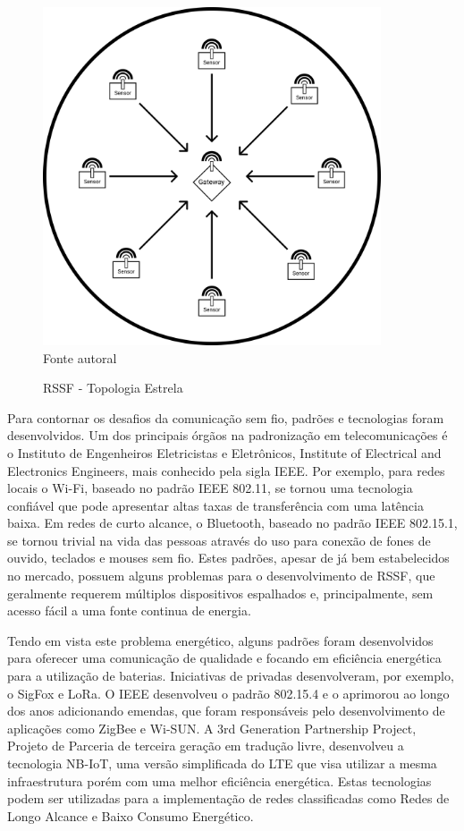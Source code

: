 \begin{figure}[ht]
    \begin{center}
        \caption{RSSF - Topologia Estrela}
        \includegraphics[width=10cm]{./sections/textual/chapters/images/intro_rssf.png}\\
        Fonte autoral
        \label{fig:rssf}
    \end{center}
\end{figure}

Para contornar os desafios da comunicação sem fio, padrões e tecnologias foram desenvolvidos. Um dos principais órgãos na padronização em telecomunicações é o Instituto de Engenheiros Eletricistas e Eletrônicos, Institute of Electrical and Electronics Engineers, mais conhecido pela sigla IEEE. Por exemplo, para redes locais o Wi-Fi, baseado no padrão IEEE 802.11, se tornou uma tecnologia confiável que pode apresentar altas taxas de transferência com uma latência baixa. Em redes de curto alcance, o Bluetooth, baseado no padrão IEEE 802.15.1, se tornou trivial na vida das pessoas através do uso para conexão de fones de ouvido, teclados e mouses sem fio. Estes padrões, apesar de já bem estabelecidos no mercado, possuem alguns problemas para o desenvolvimento de RSSF, que geralmente requerem múltiplos dispositivos espalhados e, principalmente, sem acesso fácil a uma fonte continua de energia.

Tendo em vista este problema energético, alguns padrões foram desenvolvidos para oferecer uma comunicação de qualidade e focando em eficiência energética para a utilização de baterias. Iniciativas de privadas desenvolveram, por exemplo, o SigFox e LoRa. O IEEE desenvolveu o padrão 802.15.4 e o aprimorou ao longo dos anos adicionando emendas, que foram responsáveis pelo desenvolvimento de aplicações como ZigBee e Wi-SUN. A 3rd Generation Partnership Project, Projeto de Parceria de terceira geração em tradução livre, desenvolveu a tecnologia NB-IoT, uma versão simplificada do LTE que visa utilizar a mesma infraestrutura porém com uma melhor eficiência energética. Estas tecnologias podem ser utilizadas para a implementação de redes classificadas como Redes de Longo Alcance e Baixo Consumo Energético.

